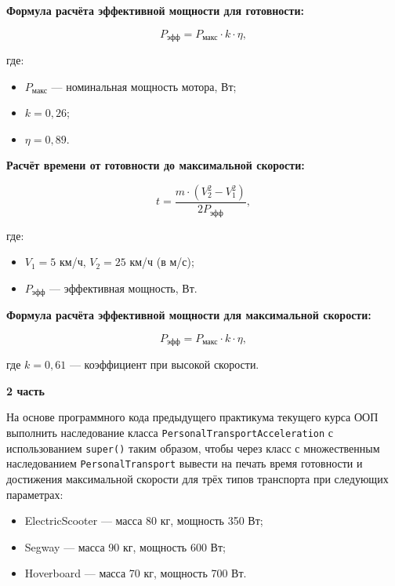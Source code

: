 \begin{enumerate}
\textbf{Формула расчёта эффективной мощности для готовности:}

\begin{equation}
P_{\text{эфф}} = P_{\text{макс}} \cdot k \cdot \eta,
\end{equation}

где:  
\begin{itemize}
    \item $P_{\text{макс}}$ — номинальная мощность мотора, Вт;  
    \item $k = 0{,}26$;  
    \item $\eta = 0{,}89$.  
\end{itemize}

\textbf{Расчёт времени от готовности до максимальной скорости:}

\begin{equation}
t = \frac{m \cdot (V_2^2 - V_1^2)}{2P_{\text{эфф}}},
\end{equation}

где:  
\begin{itemize}
    \item $V_1 = 5$ км/ч, $V_2 = 25$ км/ч (в м/с);  
    \item $P_{\text{эфф}}$ — эффективная мощность, Вт.  
\end{itemize}

\textbf{Формула расчёта эффективной мощности для максимальной скорости:}

\begin{equation}
P_{\text{эфф}} = P_{\text{макс}} \cdot k \cdot \eta,
\end{equation}

где $k = 0{,}61$ — коэффициент при высокой скорости.

\textbf{2 часть}

На основе программного кода предыдущего практикума текущего курса ООП выполнить наследование класса \texttt{PersonalTransportAcceleration} с использованием \texttt{super()} таким образом, чтобы через класс с множественным наследованием \texttt{PersonalTransport} вывести на печать время готовности и достижения максимальной скорости для трёх типов транспорта при следующих параметрах:

\begin{itemize}
    \item ElectricScooter — масса 80 кг, мощность 350 Вт;  
    \item Segway — масса 90 кг, мощность 600 Вт;  
    \item Hoverboard — масса 70 кг, мощность 700 Вт.  
\end{itemize}


\end{enumerate}

